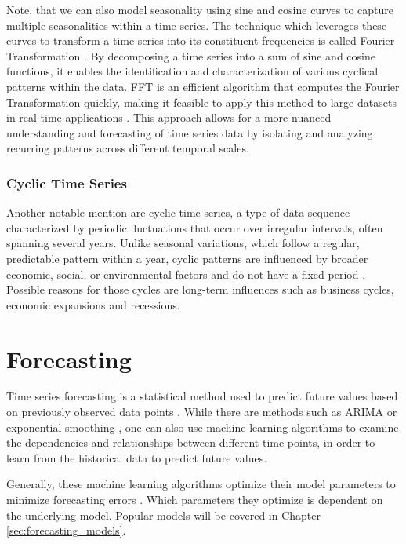 Note, that we can also model seasonality using sine and cosine curves to capture multiple seasonalities within a time series. The technique which leverages these curves to transform a time series into its constituent frequencies is called Fourier Transformation \parencite[ch. 1]{bloomfield2004fourier}. By decomposing a time series into a sum of sine and cosine functions, it enables the identification and characterization of various cyclical patterns within the data. \ac{FFT} is an efficient algorithm that computes the Fourier Transformation quickly, making it feasible to apply this method to large datasets in real-time applications \parencite[ch. 5]{bloomfield2004fourier}. This approach allows for a more nuanced understanding and forecasting of time series data by isolating and analyzing recurring patterns across different temporal scales.

\subsubsection*{Cyclic Time Series}
Another notable mention are cyclic time series, a type of data sequence characterized by periodic fluctuations that occur over irregular intervals, often spanning several years. Unlike seasonal variations, which follow a regular, predictable pattern within a year, cyclic patterns are influenced by broader economic, social, or environmental factors and do not have a fixed period \parencite[p.4102]{gharehbaghi2017deep}. Possible reasons for those cycles are long-term influences such as business cycles, economic expansions and recessions.

\section{Forecasting}
\label{sec:Forecasting}
Time series forecasting is a statistical method used to predict future values based on previously observed data points \parencite[ch. 5]{box2015time}. While there are methods such as \ac{ARIMA} or exponential smoothing \parencite[ch. 5]{box2015time}, one can also use machine learning algorithms to examine the dependencies and relationships between different time points, in order to learn from the historical data to predict future values.

Generally, these machine learning algorithms optimize their model parameters to minimize forecasting errors \parencite[ch. 5]{box2015time}. Which parameters they optimize is dependent on the underlying model. Popular models will be covered in Chapter \ref{sec:forecasting_models}.


